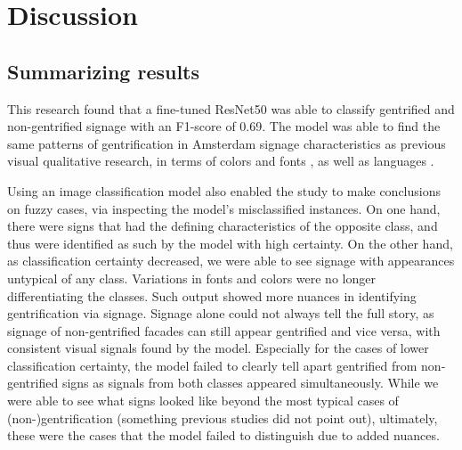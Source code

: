 \section{Discussion}
\label{sec:discussion}

\subsection{Summarizing results}

This research found that a fine-tuned ResNet50 was able to classify gentrified and non-gentrified signage with an F1-score of 0.69. The model was able to find the same patterns of gentrification in Amsterdam signage characteristics as previous visual qualitative research, in terms of colors and fonts \cite{rahman_signage_2020, trinch_signsays_2017, snajdr_oldschool_2018, snajdr_preserve_2022}, as well as languages \cite{kasanga_map_2012, trinch_signsays_2017}.

Using an image classification model also enabled the study to make conclusions on fuzzy cases, via inspecting the model's misclassified instances. On one hand, there were signs that had the defining characteristics of the opposite class, and thus were identified as such by the model with high certainty. On the other hand, as classification certainty decreased, we were able to see signage with appearances untypical of any class. Variations in fonts and colors were no longer differentiating the classes. Such output showed more nuances in identifying gentrification via signage. Signage alone could not always tell the full story, as signage of non-gentrified facades can still appear gentrified and vice versa, with consistent visual signals found by the model. Especially for the cases of lower classification certainty, the model failed to clearly tell apart gentrified from non-gentrified signs as signals from both classes appeared simultaneously. While we were able to see what signs looked like  beyond the most typical cases of (non-)gentrification (something previous studies did not point out), ultimately, these were the cases that the model failed to distinguish due to added nuances.


